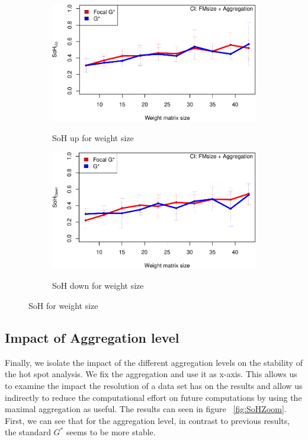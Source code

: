 \documentclass{itatnew}
\begin{document}
\begin{figure}[htp]
  \begin{subfigure}{\linewidth}
    \caption{SoH up for weight size}
    \includegraphics[width=\linewidth]{images/gen-weight-1}
    \label{fig:wUp}
  \end{subfigure}
  \hspace{1em}
  \begin{subfigure}{\linewidth}
    \caption{SoH down for weight size}
    \includegraphics[width=\linewidth]{images/gen-weight-2}
    \label{fig:wDown}
  \end{subfigure}
  \caption{SoH for weight size}
  \label{fig:SoHWeight}
\end{figure}
%
%
\subsection{Impact of Aggregation level}
Finally, we isolate the impact of the different aggregation levels on the stability of the hot spot analysis. 
We fix the aggregation and use it as x-axis. This allows us to examine the impact
the resolution of a data set has on the results and allow us indirectly to reduce the 
computational effort on future computations by using the maximal aggregation as useful.
The results can seen in figure ~\ref{fig:SoHZoom}.
First, we can see that for the aggregation level, in contrast to previous 
results, the standard $G^*$ seems to be more stable.
\end{document}
